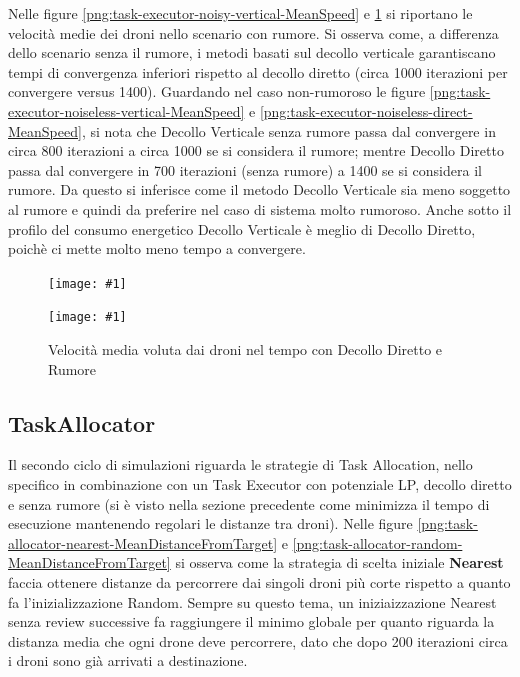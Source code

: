 \documentclass[a4paper,11pt,oneside, table]{article}
\newcommand{\putsubimage}[5] {
  \begin{minipage}{{#4}\linewidth}
	    \centering
      \texttt{[image: \#1]}
	    \caption{#2}\label{#3}
	\end{minipage}
}
\newcommand{\putimagecouple}[2] {
  \begin{figure}[!htb]
      \centering
      #1
      \hspace{0.5cm}
      #2
  \end{figure}
}
\begin{document}
Nelle figure \ref{png:task-executor-noisy-vertical-MeanSpeed} e \ref{png:task-executor-noisy-direct-MeanSpeed} si riportano le velocit\`a medie dei droni nello scenario con rumore.
Si osserva  come, a differenza dello scenario senza il rumore, i metodi basati sul decollo verticale garantiscano tempi di convergenza inferiori rispetto al decollo diretto (circa 1000 iterazioni per convergere versus 1400).
Guardando nel caso non-rumoroso le figure \ref{png:task-executor-noiseless-vertical-MeanSpeed} e \ref{png:task-executor-noiseless-direct-MeanSpeed}, si nota che Decollo Verticale senza rumore passa dal convergere in circa 800 iterazioni a circa 1000 se si considera il rumore; mentre Decollo Diretto passa dal convergere in 700 iterazioni (senza rumore) a 1400 se si considera il rumore.
Da questo si inferisce come il metodo Decollo Verticale sia meno soggetto al rumore e quindi da preferire nel caso di sistema molto rumoroso.
Anche sotto il profilo del consumo energetico Decollo Verticale \`e meglio di Decollo Diretto, poich\`e ci mette molto meno tempo a convergere.

\putimagecouple
{\putsubimage{images/experiments/task-executor-noisy-vertical/MeanSpeed.png}{Velocit\`a media voluta dai droni nel tempo con Decollo Verticale e Rumore}{png:task-executor-noisy-vertical-MeanSpeed}{0.4}{0.99}}
{\putsubimage{images/experiments/task-executor-noisy-direct/MeanSpeed.png}{Velocit\`a media voluta dai droni nel tempo con Decollo Diretto e Rumore}{png:task-executor-noisy-direct-MeanSpeed}{0.4}{0.99}}

\subsection{TaskAllocator}

Il secondo ciclo di simulazioni riguarda le strategie di Task Allocation, nello specifico in combinazione con un Task Executor con potenziale LP, decollo diretto e senza rumore (si \`e visto nella sezione precedente come minimizza il tempo di esecuzione mantenendo regolari le distanze tra droni).
Nelle figure \ref{png:task-allocator-nearest-MeanDistanceFromTarget} e \ref{png:task-allocator-random-MeanDistanceFromTarget} si osserva come la strategia di scelta iniziale \textbf{Nearest} faccia ottenere distanze da percorrere dai singoli droni pi\`u corte rispetto a quanto fa l'inizializzazione Random. 
Sempre su questo tema, un iniziaizzazione Nearest senza review successive fa raggiungere il minimo globale per quanto riguarda la distanza media che ogni drone deve percorrere, dato che dopo 200 iterazioni circa i droni sono gi\`a arrivati a destinazione.
\end{document}
